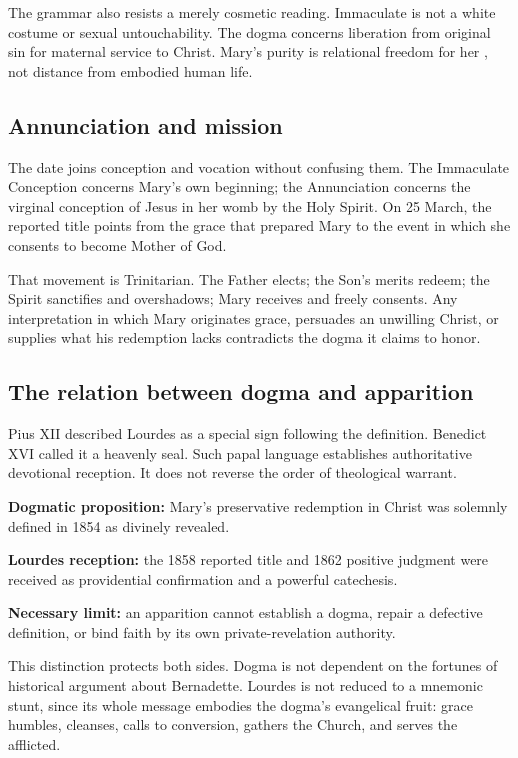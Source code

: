 The grammar also resists a merely cosmetic reading. Immaculate is not a white costume or sexual untouchability. The dogma concerns liberation from original sin for maternal service to Christ. Mary's purity is relational freedom for her , not distance from embodied human life.

\subsection{Annunciation and mission}

The date joins conception and vocation without confusing them. The Immaculate Conception concerns Mary's own beginning; the Annunciation concerns the virginal conception of Jesus in her womb by the Holy Spirit. On 25 March, the reported title points from the grace that prepared Mary to the event in which she consents to become Mother of God.

That movement is Trinitarian. The Father elects; the Son's merits redeem; the Spirit sanctifies and overshadows; Mary receives and freely consents. Any interpretation in which Mary originates grace, persuades an unwilling Christ, or supplies what his redemption lacks contradicts the dogma it claims to honor.

\subsection{The relation between dogma and apparition}

Pius XII described Lourdes as a special sign following the definition. Benedict XVI called it a heavenly seal. Such papal language establishes authoritative devotional reception. It does not reverse the order of theological warrant.

\begin{studyframe}
\textbf{Dogmatic proposition:} Mary's preservative redemption in Christ was solemnly defined in 1854 as divinely revealed.\par
\textbf{Lourdes reception:} the 1858 reported title and 1862 positive judgment were received as providential confirmation and a powerful catechesis.\par
\textbf{Necessary limit:} an apparition cannot establish a dogma, repair a defective definition, or bind faith by its own private-revelation authority.
\end{studyframe}

This distinction protects both sides. Dogma is not dependent on the fortunes of historical argument about Bernadette. Lourdes is not reduced to a mnemonic stunt, since its whole message embodies the dogma's evangelical fruit: grace humbles, cleanses, calls to conversion, gathers the Church, and serves the afflicted.

